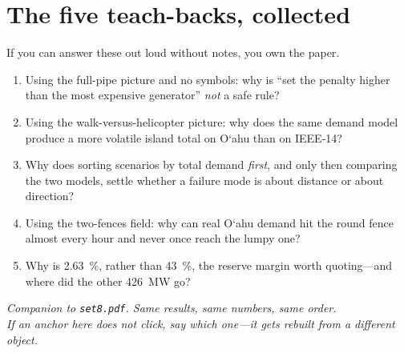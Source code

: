 \documentclass[11pt,a4paper]{article}
\newcommand{\okina}{\textquoteleft}
\begin{document}
\section{The five teach-backs, collected}

If you can answer these out loud without notes, you own the paper.

\begin{enumerate}[label=\textbf{\arabic*.},itemsep=0.7em]
\item Using the full-pipe picture and no symbols: why is ``set the penalty
higher than the most expensive generator'' \emph{not} a safe rule?

\item Using the walk-versus-helicopter picture: why does the same demand model
produce a more volatile island total on O\okina ahu than on IEEE-14?

\item Why does sorting scenarios by total demand \emph{first}, and only then
comparing the two models, settle whether a failure mode is about distance or
about direction?

\item Using the two-fences field: why can real O\okina ahu demand hit the round
fence almost every hour and never once reach the lumpy one?

\item Why is \SI{2.63}{\percent}, rather than \SI{43}{\percent}, the reserve
margin worth quoting---and where did the other \SI{426}{\mega\watt} go?
\end{enumerate}

\vfill
\begin{center}
\small\itshape
Companion to \texttt{set8.pdf}. Same results, same numbers, same order.\\
If an anchor here does not click, say which one---it gets rebuilt from a
different object.
\end{center}
\end{document}
